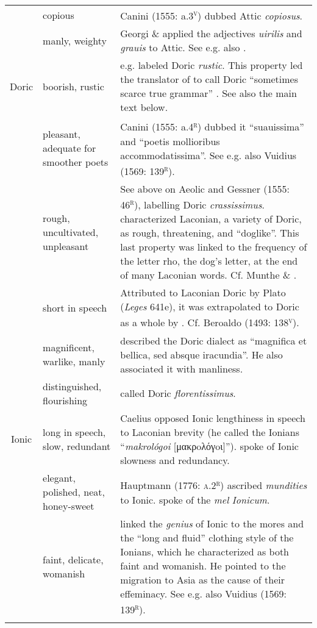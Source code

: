\begin{table}
\begin{tabularx}{\textwidth}{XXX}
& copious & Canini (1555: a.3\textsc{\textsuperscript{v}}) dubbed Attic \textit{copiosus}.\\
 & manly, weighty & Georgi \& \citet[6]{Graun1729} applied the adjectives \textit{uirilis} and \textit{grauis} to Attic. See e.g. also \citet[515]{Fabricius1711}.\\
\multicolumn{1}{c}{Doric} & boorish, rustic & \citet[317]{Bentley1699} e.g. labeled Doric \textit{rustic}. This property led the translator of \citet[117]{Rapin1659} to call Doric “sometimes scarce true grammar” \citep[31]{Rapin1684}. See also the main text below.\\
& pleasant, adequate for smoother poets & Canini (1555: a.4\textsc{\textsuperscript{r}}) dubbed it “suauissima” and “poetis mollioribus accommodatissima”. See e.g. also Vuidius (1569: 139\textsc{\textsuperscript{r}}).\\
 & rough, uncultivated, unpleasant & See above on Aeolic and Gessner (1555: 46\textsc{\textsuperscript{r}}), labelling Doric \textit{crassissimus}. \citet[54]{Vossius1673} characterized Laconian, a variety of Doric, as rough, threatening, and “doglike”. This last property was linked to the frequency of the letter rho, the dog’s letter, at the end of many Laconian words. Cf. Munthe \& \citet[24]{Heiberg1748}.\\
 & short in speech & Attributed to Laconian Doric by Plato (\textit{Leges} 641e), it was extrapolated to Doric as a whole by \citet[393]{Saumaise1643a}. Cf. Beroaldo (1493: 138\textsc{\textsuperscript{v}}).\\
 & magnificent, warlike, manly & \citet[55]{Vossius1673} described the Doric dialect as “magnifica et bellica, sed absque iracundia”. He also associated it with manliness.\\
 & distinguished, flourishing & \citet[161]{Gesner1774} called Doric \textit{florentissimus}.\\
\multicolumn{1}{c}{Ionic} & long in speech, slow, redundant & Caelius \citet[677]{Rhodiginus1542} opposed Ionic lengthiness in speech to Laconian brevity (he called the Ionians “\textit{makrológoi} [μακρoλόγoι]”). \citet[75]{Saumaise1643a} spoke of Ionic slowness and redundancy.\\
& elegant, polished, neat, honey-sweet & Hauptmann (1776: \textsc{a.2}\textsc{\textsuperscript{r}}) ascribed \textit{mundities} to Ionic. \citet[290]{Verwey1684} spoke of the \textit{mel} \textit{Ionicum}.\\
 & faint, delicate, womanish & \citet[75]{Saumaise1643a} linked the \textit{genius} of Ionic to the mores and the “long and fluid” clothing style of the Ionians, which he characterized as both faint and womanish. He pointed to the migration to Asia as the cause of their effeminacy. See e.g. also Vuidius (1569: 139\textsc{\textsuperscript{r}}).\\

\lspbottomrule
\end{tabularx}
\end{table}

